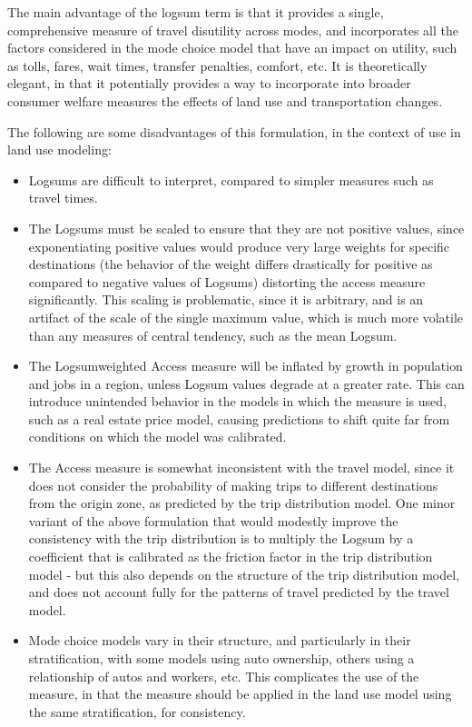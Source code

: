 The main advantage of the logsum term is that it provides a
single, comprehensive measure of travel disutility across modes,
and incorporates all the factors considered in the mode choice
model that have an impact on utility, such as tolls, fares, wait
times, transfer penalties, comfort, etc.  It is theoretically
elegant, in that it potentially provides a way to incorporate into
broader consumer welfare measures the effects of land use and
transportation changes.

The following are some disadvantages of this formulation, in the
context of use in land use modeling:

\begin{itemize}

\item Logsums are difficult to interpret, compared to simpler
measures such as travel times.

\item The Logsums must be scaled to ensure that they are not
positive values, since exponentiating positive values would
produce very large weights for specific destinations (the behavior
of the weight differs drastically for positive as compared to
negative values of Logsums) distorting the access measure
significantly.  This scaling is problematic, since it is
arbitrary, and is an artifact of the scale of the single maximum
value, which is much more volatile than any measures of central
tendency, such as the mean Logsum.

\item The Logsum\-weighted Access measure will be inflated by
growth in population and jobs in a region, unless Logsum values
degrade at a greater rate.  This can introduce unintended behavior
in the models in which the measure is used, such as a real estate
price model, causing predictions to shift quite far from
conditions on which the model was calibrated.

\item The Access measure is somewhat inconsistent with the travel
model, since it does not consider the probability of making trips
to different destinations from the origin zone, as predicted by
the trip distribution model.  One minor variant of the above
formulation that would modestly improve the consistency with the
trip distribution is to multiply the Logsum by a coefficient that
is calibrated as the friction factor in the trip distribution
model - but this also depends on the structure of the trip
distribution model, and does not account fully for the patterns of
travel predicted by the travel model.

\item Mode choice models vary in their structure, and particularly
in their stratification, with some models using auto ownership,
others using a relationship of autos and workers, etc. This
complicates the use of the measure, in that the measure should be
applied in the land use model using the same stratification, for
consistency.

\end{itemize}

